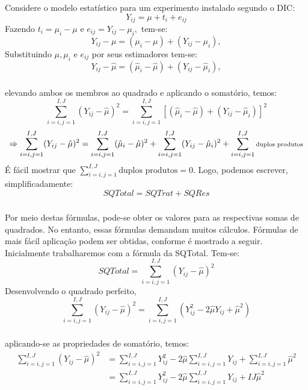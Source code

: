 \documentclass[14pt,aspectratio=1610]{beamer}
\begin{document}
\begin{frame}{}
\frametitle{}
\begin{block}{}
\justifying
Considere o modelo estatístico para um experimento instalado segundo o DIC:
$$Y_{ij}=\mu+t_{i}+e_{ij}$$\pause
Fazendo $t_{i}=\mu_{i}-\mu$ e $e_{ij}=Y_{ij}-\mu_{i},$ tem-se:\pause
$$Y_{ij}-\mu=(\mu_{i}-\mu)+(Y_{ij}-\mu_{i}),$$\pause
Substituindo $\mu,\mu_{i}$ e $e_{ij}$ por seus estimadores tem-se:\pause
$$Y_{ij}-\hat{\mu}=(\hat{\mu}_{i}-\hat{\mu})+(Y_{ij}-\hat{\mu}_{i}),$$
\end{block}
\end{frame}

\begin{frame}{}
\frametitle{}
\begin{block}{}
\justifying
elevando ambos os membros ao quadrado e aplicando o somatório, temos:
$${\displaystyle \sum_{i=i,j=1}^{I,J}(Y_{ij}-\hat{\mu})^{2}=\sum_{i=i,j=1}^{I,J}\left[(\hat{\mu}_{i}-\hat{\mu})+(Y_{ij}-\hat{\mu}_{i})\right]^{2}}$$
$$\Rightarrow{\scriptsize{\displaystyle \sum_{i=i,j=1}^{I,J}(Y_{ij}-\hat{\mu})^{2}=\sum_{i=i,j=1}^{I,J}(\hat{\mu}_{i}-\hat{\mu})^{2}+\sum_{i=i,j=1}^{I,J}(Y_{ij}-\hat{\mu}_{i})^{2}+\sum_{i=i,j=1}^{I,J}\textrm{duplos produtos}}}$$
É fácil mostrar que ${\displaystyle \sum_{i=i,j=1}^{I,J}\textrm{duplos produtos}=0.}$ Logo, podemos escrever, simplificadamente:
$$SQTotal=SQTrat+SQRes$$
\end{block}
\end{frame}

\begin{frame}{}
\frametitle{}
\begin{block}{}
\justifying
Por meio destas fórmulas, pode-se obter os valores para as respectivas somas de quadrados. No entanto, essas fórmulas demandam muitos cálculos. Fórmulas de mais fácil aplicação podem ser obtidas, conforme é mostrado a seguir. Inicialmente trabalharemos com a fórmula da SQTotal. Tem-se:
$$SQTotal={\displaystyle \sum_{i=i,j=1}^{I,J}(Y_{ij}-\hat{\mu})^{2}}$$\pause
Desenvolvendo o quadrado perfeito,
$${\displaystyle \sum_{i=i,j=1}^{I,J}(Y_{ij}-\hat{\mu})^{2}=\sum_{i=i,j=1}^{I,J}(Y_{ij}^{2}-2\hat{\mu}Y_{ij}+\hat{\mu}^{2})}$$
\end{block}
\end{frame}

\begin{frame}{}
\frametitle{}
\begin{block}{}
\justifying
aplicando-se as propriedades de somatório, temos:
\begin{align}
{\displaystyle \sum_{i=i,j=1}^{I,J}(Y_{ij}-\hat{\mu})^{2}}&=
{\displaystyle \sum_{i=i,j=1}^{I,J}Y_{ij}^{2}-2\hat{\mu}\sum_{i=i,j=1}^{I,J}Y_{ij}+\sum_{i=i,j=1}^{I,J}\hat{\mu}^{2}}\\
&={\displaystyle \sum_{i=i,j=1}^{I,J}Y_{ij}^{2}-2\hat{\mu}\sum_{i=i,j=1}^{I,J}Y_{ij}+IJ\hat{\mu}^{2}}
\end{align}
\end{block}
\end{frame}
\end{document}
